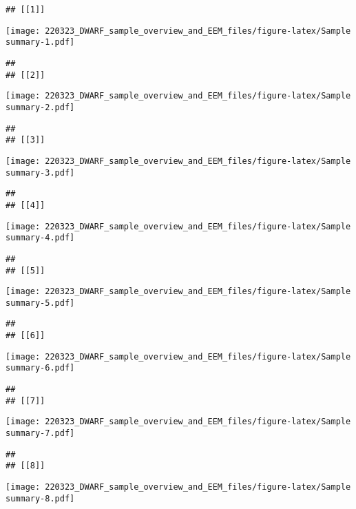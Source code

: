 \documentclass[
]{article}
\begin{document}
\begin{verbatim}
## [[1]]
\end{verbatim}

\texttt{[image: 220323\_DWARF\_sample\_overview\_and\_EEM\_files/figure-latex/Sample summary-1.pdf]}

\begin{verbatim}
## 
## [[2]]
\end{verbatim}

\texttt{[image: 220323\_DWARF\_sample\_overview\_and\_EEM\_files/figure-latex/Sample summary-2.pdf]}

\begin{verbatim}
## 
## [[3]]
\end{verbatim}

\texttt{[image: 220323\_DWARF\_sample\_overview\_and\_EEM\_files/figure-latex/Sample summary-3.pdf]}

\begin{verbatim}
## 
## [[4]]
\end{verbatim}

\texttt{[image: 220323\_DWARF\_sample\_overview\_and\_EEM\_files/figure-latex/Sample summary-4.pdf]}

\begin{verbatim}
## 
## [[5]]
\end{verbatim}

\texttt{[image: 220323\_DWARF\_sample\_overview\_and\_EEM\_files/figure-latex/Sample summary-5.pdf]}

\begin{verbatim}
## 
## [[6]]
\end{verbatim}

\texttt{[image: 220323\_DWARF\_sample\_overview\_and\_EEM\_files/figure-latex/Sample summary-6.pdf]}

\begin{verbatim}
## 
## [[7]]
\end{verbatim}

\texttt{[image: 220323\_DWARF\_sample\_overview\_and\_EEM\_files/figure-latex/Sample summary-7.pdf]}

\begin{verbatim}
## 
## [[8]]
\end{verbatim}

\texttt{[image: 220323\_DWARF\_sample\_overview\_and\_EEM\_files/figure-latex/Sample summary-8.pdf]}
\end{document}
